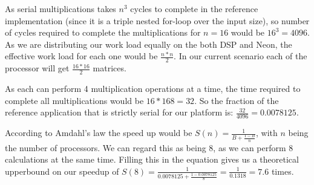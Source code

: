 As serial multiplications takes $n^3$ cycles to complete in the reference implementation (since it is a triple nested for-loop over the input size), so number of cycles required to complete the multiplications for $n = 16$ would be $16^3 = 4096$. As we are distributing our work load equally on the both DSP and Neon, the effective work load for each one would be $\frac{n * n}{2}$. In our current scenario each of the processor will get $\frac{16 * 16}{2}$ matrices.

As each can perform 4 multiplication operations at a time, the time required to complete all multiplications would be ${16*16}{8} = 32$. So the fraction of the reference application that is strictly serial for our platform is: $\frac{32}{4096} = 0.0078125$.

According to Amdahl's law the speed up would be $S(n) = \frac{1}{B + \frac{1 - B}{n}}$, with $n$ being the number of processors. We can regard this as being 8, as we can perform 8 calculations at the same time. Filling this in the equation gives us a theoretical upperbound on our speedup of $S(8) = \frac{1}{{0.0078125 + \frac{1 - 0.0078125}{8}}} = \frac{1}{0.1318} = 7.6$ times.
